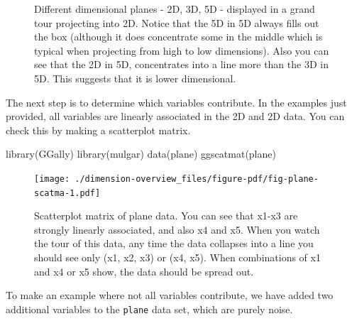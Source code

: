 \documentclass[
  letterpaper,
]{book}
\newenvironment{Shaded}{\begin{snugshade}}{\end{snugshade}}
\newcommand{\FunctionTok}[1]{\textcolor[rgb]{0.28,0.35,0.67}{#1}}
\newcommand{\NormalTok}[1]{\textcolor[rgb]{0.00,0.23,0.31}{#1}}
\begin{document}
\begin{figure}

\begin{minipage}[t]{0.33\linewidth}

{\centering 

}

\end{minipage}%

\caption{\label{fig-dimension}Different dimensional planes - 2D, 3D, 5D
- displayed in a grand tour projecting into 2D. Notice that the 5D in 5D
always fills out the box (although it does concentrate some in the
middle which is typical when projecting from high to low dimensions).
Also you can see that the 2D in 5D, concentrates into a line more than
the 3D in 5D. This suggests that it is lower dimensional.}

\end{figure}

The next step is to determine which variables contribute. In the
examples just provided, all variables are linearly associated in the 2D
and 2D data. You can check this by making a scatterplot matrix.

\begin{Shaded}
\begin{Highlighting}[]
\FunctionTok{library}\NormalTok{(GGally)}
\FunctionTok{library}\NormalTok{(mulgar)}
\FunctionTok{data}\NormalTok{(plane)}
\FunctionTok{ggscatmat}\NormalTok{(plane)}
\end{Highlighting}
\end{Shaded}

\begin{figure}[H]

{\centering \texttt{[image: ./dimension-overview\_files/figure-pdf/fig-plane-scatma-1.pdf]}

}

\caption{\label{fig-plane-scatma}Scatterplot matrix of plane data. You
can see that x1-x3 are strongly linearly associated, and also x4 and x5.
When you watch the tour of this data, any time the data collapses into a
line you should see only (x1, x2, x3) or (x4, x5). When combinations of
x1 and x4 or x5 show, the data should be spread out.}

\end{figure}

To make an example where not all variables contribute, we have added two
additional variables to the \texttt{plane} data set, which are purely
noise.
\end{document}
